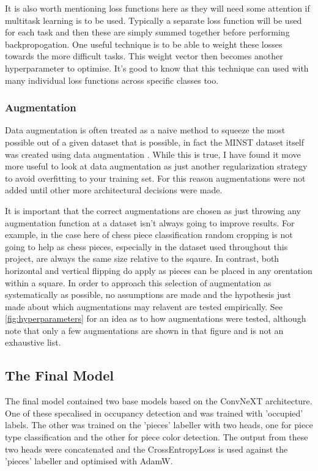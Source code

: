 It is also worth mentioning loss functions here as they will need some attention if multitask learning is to be used.  Typically a separate loss function will be 
used for each task and then these are simply summed together before performing backpropogation.  One useful technique is to be able to weight these losses towards 
the more difficult tasks.  This weight vector then becomes another hyperparameter to optimise.  It's good to know that this technique can used with many 
individual loss functions across specific classes too.

\subsubsection{Augmentation}
Data augmentation is often treated as a naive method to squeeze the most possible out of a given dataset that is possible, in fact the MINST dataset itself was 
created using data augmentation \cite{cohen2017emnist}.  While this is true, I have found 
it move more useful to look at data augmentation as just another regularization strategy to avoid overfitting to your training set.  For this reason 
augmentations were not added until other more architectural decisions were made.

It is important that the correct augmentations are chosen as just 
throwing any augmentation function at a dataset isn't always going to improve results.
For example, in the case here of chess piece classification random cropping is not going to help as chess pieces, especially in the dataset used throughout this 
project, are always the same size relative to the sqaure.  In contrast, both horizontal and vertical flipping do apply as pieces can be placed in any orentation 
within a square.
In order to approach this selection of augmentation as systematically as possible, no assumptions are made and the hypothesis just made about which augmentations 
may relavent are tested empirically.  See \autoref{fig:hyperparameters} for an idea as to how augmentations were tested, although note that only a few augmentations 
are shown in that figure and is not an exhaustive list.

\subsection{The Final Model}
\label{the model}
The final model contained two base models based on the ConvNeXT architecture.  One of these specalised in occupancy detection and was trained with 'occupied' labels.
The other was trained on the 'pieces' labeller with two heads, one for piece type classification and the other for piece color detection.  The output from these two 
heads were concatenated and the CrossEntropyLoss is used against the 'pieces' labeller and optimised with AdamW.



